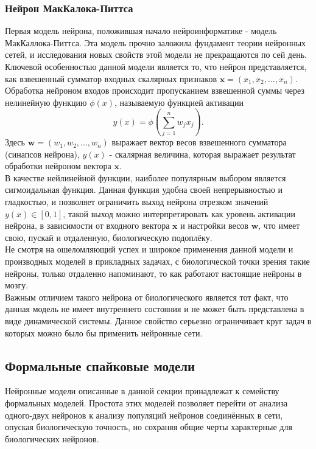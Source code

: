 \documentclass[a4paper,10pt]{article}
\begin{document}
\subsubsection{Нейрон МакКалока-Питтса}
   Первая модель нейрона, положившая начало нейроинформатике  - модель МакКаллока-Питтса. Эта модель прочно заложила фундамент теории нейронных сетей, и исследования новых свойств этой модели не   прекращаются по сей день.\\
   \indent Ключевой особенностью данной модели является то, что нейрон представляется, как взвешенный сумматор входных скалярных признаков $\boldsymbol{x}=(x_{1},x_{2},...,x_{n})$. Обработка нейроном входов происходит пропусканием взвешенной суммы через нелинейную функцию $\phi(x)$, называемую функцией активации\\
   \begin{equation}\label{eq:sum_mp}
   y(x) = \phi(\sum_{j=1}^{n}w_{j}x_{j}).
   \end{equation}
\indent Здесь $\boldsymbol{w}=(w_{1}, w_{2},...,w_{n})$ выражает вектор весов взвешенного сумматора (синапсов нейрона), $y(x)$ - скалярная величина, которая выражает результат обработки нейроном вектора $\boldsymbol{x}$.\\	
	\indent В качестве нейлинейной функции, наиболее популярным выбором является сигмоидальная функция\cite{Zaencev1999}. Данная функция удобна своей непрерывностью и гладкостью, и позволяет ограничить выход нейрона  отрезком значений $y(x)\in[0,1]$, такой выход можно интерпретировать как уровень активации нейрона, в зависимости от входного вектора $\boldsymbol{x}$ и настройки весов $\boldsymbol{w}$, что имеет свою, пускай и отдаленную, биологическую подоплёку. \\
   \indent Не смотря на ошеломляющий успех и широкое применения данной модели  и производных моделей в прикладных задачах, с биологической точки зрения такие нейроны, только отдаленно напоминают, то как работают настоящие нейроны в мозгу.\\
   \indent Важным отличием такого нейрона от биологического является тот факт, что данная модель не имеет внутреннего состояния и не может быть представлена в виде динамической системы\cite{Zaencev1999}. Данное свойство серьезно ограничивает круг задач в которых можно было бы применить нейронные сети. 

\subsection{Формальные спайковые модели}   
\indent Нейронные модели описанные в данной секции принадлежат к семейству формальных моделей. Простота этих моделей позволяет перейти от анализа одного-двух нейронов к анализу популяций нейронов соединённых в сети, опуская биологическую точность, но сохраняя общие черты характерные для биологических нейронов.\\
\end{document}
